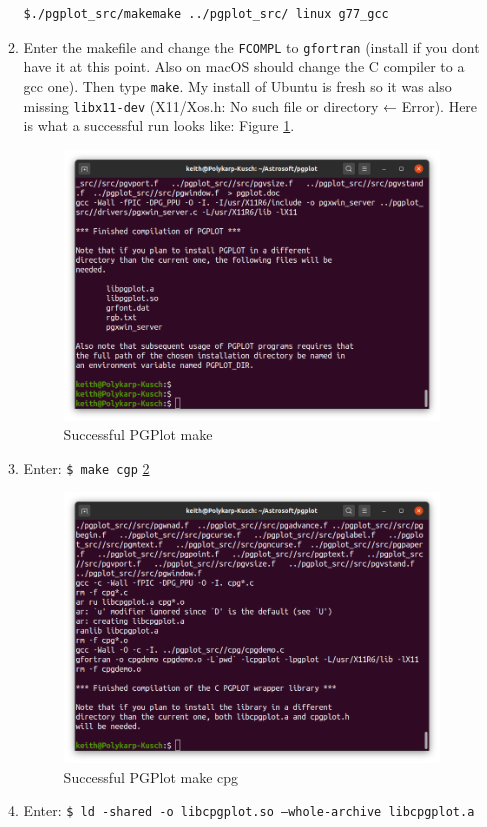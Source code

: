 \documentclass{article}
\begin{document}
\begin{enumerate}
\begin{enumerate}
\begin{lstlisting}[language=bash]
$./pgplot_src/makemake ../pgplot_src/ linux g77_gcc
    \end{lstlisting}
    \item Enter the makefile and change the \texttt{FCOMPL} to \texttt{gfortran} (install if you dont have it at this point. Also on macOS should change the C compiler to a gcc one). Then type \texttt{make}. My install of Ubuntu is fresh so it was also missing \texttt{libx11-dev} (X11/Xos.h: No such file or directory ← Error). Here is what a successful run looks like: Figure \ref{fig:pgplot-make}.     			
\begin{figure}[h]
\includegraphics[width=\linewidth]{Images/sucesfful-pgplot-make.png}
\caption{Successful PGPlot make}
\label{fig:pgplot-make}  			
\end{figure}
    \item Enter: \texttt{\$ make cgp} \ref{fig:pgplot-make-cpg}
\begin{figure}[h]
\includegraphics[width=\linewidth]{Images/sucesfful-pgplot-make-cgp.png}
\caption{Successful PGPlot make cpg}
\label{fig:pgplot-make-cpg}  			
\end{figure}
    \item Enter: \texttt{\$ ld -shared -o libcpgplot.so --whole-archive libcpgplot.a}
    			

\end{enumerate}
\end{enumerate}
\end{document}

